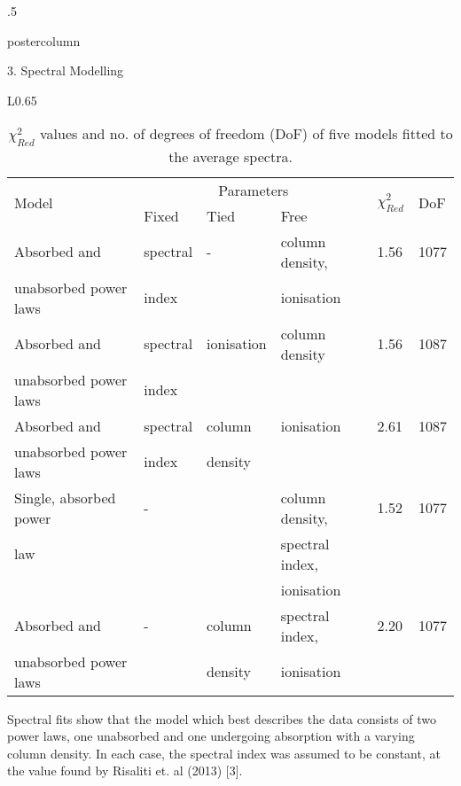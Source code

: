 \documentclass[final]{beamer}
\begin{document}
\begin{frame}
\begin{columns}
\begin{column}{.5\textwidth}
\begin{beamercolorbox}[center,wd=\textwidth]{postercolumn}
\begin{minipage}[T]{.98\textwidth}
{\begin{block}{3. Spectral Modelling}
\begin{wrapfigure}{L}{0.65\textwidth}
\begin{table}[ht!]
\begin{tabular}{| p{7.5cm}|| p{3cm} | p{3cm} | p{5.2cm} || p{1.5cm} | p{1.7cm}  |}
		
		
		\multirow{2}{*}{Model}		   	& \multicolumn{3}{|c||}{Parameters}			&\multirow{2}{*}{$\chi^2_{Red}$}&\multirow{2}{*}{DoF} \\ \hhline{~---~~}   
							& Fixed		& Tied		& Free			& 		& \\ \hline
		Absorbed and  			   	& spectral 	& - 		& column density, 	& 1.56 		& 1077 \\ 
		unabsorbed power laws		    	& index		&		& ionisation		&		&      \\ \hline			  
		Absorbed and 				& spectral 	& ionisation 	& column density 	& 1.56		& 1087 \\ 
		unabsorbed power laws			& index		&		&			&		&      \\ \hline
		Absorbed and 				& spectral	& column  	& ionisation  		& 2.61		& 1087 \\ 
		unabsorbed power laws			& index		& density	&			&		&      \\ \hline
		Single, absorbed power					& -		&  		& column density,	& 1.52		& 1077 \\ 
		law 				&		&		& spectral index,	&		&	\\
							&	 	& 		& ionisation		&		&      \\ \hline
		Absorbed and  				& -		& column 	& spectral index, 	& 2.20		& 1077 \\ 
		unabsorbed power laws			& 		& density	& ionisation		&		&      \\ \hline
		
		
		
		\end{tabular}
		
		\caption{$\chi^2_{Red}$ values and no. of degrees of freedom (DoF) of five models fitted to the average spectra.}
		
		\end{table}
		\end{wrapfigure}
		
              	Spectral fits show that the model which best describes the data consists of two power laws, 
              	one unabsorbed and one undergoing absorption with a varying column density.
              	In each case, the spectral index was assumed to be constant, at the value found
              	by Risaliti et. al (2013) [3].
              	             	
		
            \end{block}
          
	   
            
}
\end{minipage}
\end{beamercolorbox}
\end{column}
\end{columns}
\end{frame}
\end{document}
